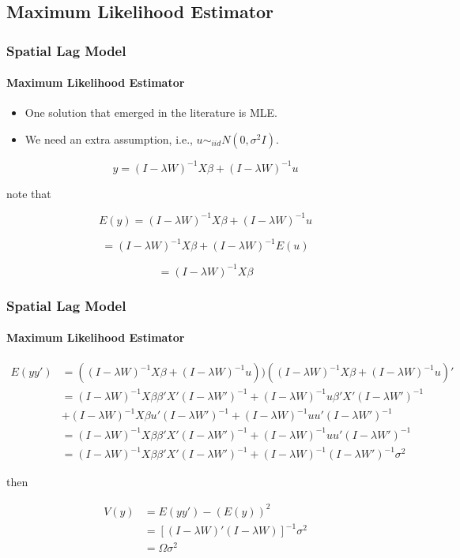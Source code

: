 \documentclass[
  shownotes,
  xcolor={svgnames},
  hyperref={colorlinks,citecolor=DarkBlue,linkcolor=DarkRed,urlcolor=DarkBlue}
  , aspectratio=169]{beamer}
\begin{document}
\subsection{Maximum Likelihood Estimator}
\begin{frame}[fragile]
\frametitle{Spatial Lag Model}
\framesubtitle{Maximum Likelihood Estimator}
\begin{itemize}
\item One solution that emerged in the literature is MLE.
\item We need an extra assumption, i.e.,  $u\sim_{iid}N(0,\sigma^{2}I)$. 
\end{itemize}

\[
y=(I-\lambda W)^{-1}X\beta+(I-\lambda W)^{-1}u
\]

note that

\[
E(y)=(I-\lambda W)^{-1}X\beta+(I-\lambda W)^{-1}u
\]

\[
=(I-\lambda W)^{-1}X\beta+(I-\lambda W)^{-1}E(u)
\]

\[
=(I-\lambda W)^{-1}X\beta
\]


\end{frame}
\begin{frame}[fragile]
\frametitle{Spatial Lag Model}
\framesubtitle{Maximum Likelihood Estimator}



\begin{align}
E(yy') & =((I-\lambda W)^{-1}X\beta+(I-\lambda W)^{-1}u))((I-\lambda W)^{-1}X\beta+(I-\lambda W)^{-1}u)' \nonumber \\ 
& = (I-\lambda W)^{-1}X\beta\beta'X'(I-\lambda W')^{-1}+(I-\lambda W)^{-1}u\beta'X'(I-\lambda W')^{-1} \nonumber \\
&+(I-\lambda W)^{-1}X\beta u'(I-\lambda W')^{-1}+(I-\lambda W)^{-1}uu'(I-\lambda W')^{-1}  \nonumber\\
&=(I-\lambda W)^{-1}X\beta\beta'X'(I-\lambda W')^{-1}+(I-\lambda W)^{-1}uu'(I-\lambda W')^{-1}  \nonumber \\
&=(I-\lambda W)^{-1}X\beta\beta'X'(I-\lambda W')^{-1}+(I-\lambda W)^{-1}(I-\lambda W')^{-1}\sigma^{2} \nonumber 
\end{align}

then

\begin{align}
V(y)&=E(yy')-(E(y))^2 \nonumber \\ 
&=[(I-\lambda W)'(I-\lambda W)]^{-1}\sigma^{2} \nonumber \\ 
&=\Omega\sigma^{2}
\end{align}


\end{frame}
\end{document}
